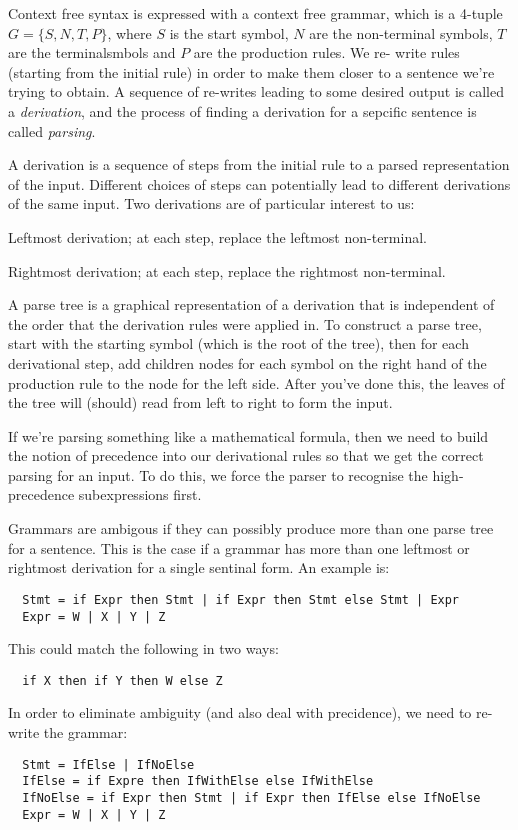 Context free syntax is expressed with a context free grammar, which is a 4-tuple
$G = \{S,N,T,P\}$, where $S$ is the start symbol, $N$ are the non-terminal
symbols, $T$ are the terminalsmbols and $P$ are the production rules. We re-
write rules (starting from the initial rule) in order to make them closer to a
sentence we're trying to obtain. A sequence of re-writes leading to some desired
output is called a \textit{derivation}, and the process of finding a derivation
for a sepcific sentence is called \textit{parsing}.

A derivation is a sequence of steps from the initial rule to a parsed
representation of the input. Different choices of steps can potentially lead to
different derivations of the same input. Two derivations are of particular
interest to us:

\begin{description}
  \item Leftmost derivation; at each step, replace the leftmost non-terminal.
  \item Rightmost derivation; at each step, replace the rightmost non-terminal.
\end{description}

A parse tree is a graphical representation of a derivation that is independent
of the order that the derivation rules were applied in. To construct a parse
tree, start with the starting symbol (which is the root of the tree), then for
each derivational step, add children nodes for each symbol on the right hand of
the production rule to the node for the left side. After you've done this, the
leaves of the tree will (should) read from left to right to form the input.

If we're parsing something like a mathematical formula, then we need to build
the notion of precedence into our derivational rules so that we get the correct
parsing for an input. To do this, we force the parser to recognise the high-
precedence subexpressions first.

Grammars are ambigous if they can possibly produce more than one parse tree for
a sentence. This is the case if a grammar has more than one leftmost or
rightmost derivation for a single sentinal form. An example is:

\begin{verbatim}
  Stmt = if Expr then Stmt | if Expr then Stmt else Stmt | Expr
  Expr = W | X | Y | Z
\end{verbatim}

This could match the following in two ways:

\begin{verbatim}
  if X then if Y then W else Z
\end{verbatim}

In order to eliminate ambiguity (and also deal with precidence), we need to re-
write the grammar:

\begin{verbatim}
  Stmt = IfElse | IfNoElse
  IfElse = if Expre then IfWithElse else IfWithElse
  IfNoElse = if Expr then Stmt | if Expr then IfElse else IfNoElse
  Expr = W | X | Y | Z
\end{verbatim}